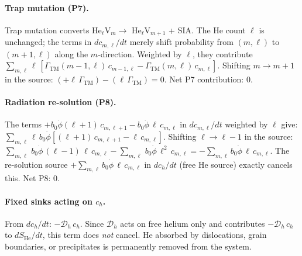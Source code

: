 \documentclass[pdflatex,sn-basic]{sn-jnl} %
\begin{document}
\paragraph{Trap mutation (P7).}
Trap mutation converts He$_\ell$V$_m \to$ He$_\ell$V$_{m+1}$ + SIA. The
He count $\ell$ is unchanged; the terms in $dc_{m,\ell}/dt$ merely shift
probability from $(m,\ell)$ to $(m+1,\ell)$ along the $m$-direction.
Weighted by $\ell$, they contribute $\sum_{m,\ell}\ell\,[\Gamma_{\mathrm{TM}}
(m{-}1,\ell)\,c_{m-1,\ell} - \Gamma_{\mathrm{TM}}(m,\ell)\,c_{m,\ell}]$.
Shifting $m \to m+1$ in the source: $(+\ell\,\Gamma_{\mathrm{TM}}) -
(\ell\,\Gamma_{\mathrm{TM}}) = 0$. Net P7 contribution: $0$. \checkmark

\paragraph{Radiation re-solution (P8).}
The terms $+b_0\dot{\phi}(\ell{+}1)\,c_{m,\ell+1} - b_0\dot{\phi}\,\ell\,
c_{m,\ell}$ in $dc_{m,\ell}/dt$ weighted by $\ell$ give:
$\sum_{m,\ell}\ell\,b_0\dot{\phi}[(\ell{+}1)\,c_{m,\ell+1}
- \ell\,c_{m,\ell}]$. Shifting $\ell \to \ell-1$ in the source:
$\sum_{m,\ell}\,b_0\dot{\phi}\,(\ell{-}1)\,\ell\,c_{m,\ell}
- \sum_{m,\ell}\,b_0\dot{\phi}\,\ell^2\,c_{m,\ell} = -\sum_{m,\ell}
b_0\dot{\phi}\,\ell\,c_{m,\ell}$.
The re-solution source $+\sum_{m,\ell}b_0\dot{\phi}\,\ell\,c_{m,\ell}$
in $dc_h/dt$ (free He source) exactly cancels this. Net P8: $0$. \checkmark

\paragraph{Fixed sinks acting on $c_h$.}
From $dc_h/dt$: $-\mathcal{D}_h\,c_h$. Since $\mathcal{D}_h$ acts on free
helium only and contributes $-\mathcal{D}_h\,c_h$ to $dS_{\mathrm{He}}/dt$,
this term does \emph{not} cancel. He absorbed by dislocations,
grain boundaries, or precipitates is permanently removed from the system.
\end{document}
